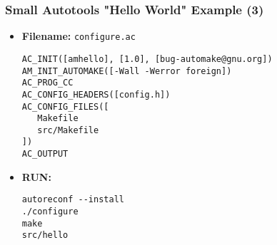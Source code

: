 \documentclass[aspectratio=169, xcolor=table, notheorems, hyperref={pdfpagelabels=false}]{beamer}
\begin{document}
\begin{frame}[fragile]
\frametitle{Small Autotools "Hello World" Example (3)}

\begin{itemize}
\item \textbf{Filename:} \texttt{configure.ac}
\begin{lstlisting}[basicstyle=\ttfamily\small]
AC_INIT([amhello], [1.0], [bug-automake@gnu.org])
AM_INIT_AUTOMAKE([-Wall -Werror foreign])
AC_PROG_CC
AC_CONFIG_HEADERS([config.h])
AC_CONFIG_FILES([
   Makefile
   src/Makefile
])
AC_OUTPUT

\end{lstlisting}

\item \textbf{RUN:}
\begin{lstlisting}[basicstyle=\ttfamily\small]
autoreconf --install
./configure
make
src/hello

\end{lstlisting}
\end{itemize}

\end{frame}

\end{document}
